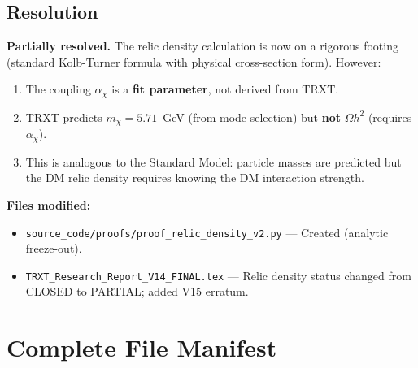 \documentclass[11pt,a4paper]{article}
\begin{document}
\subsection{Resolution}
\begin{mdframed}[backgroundcolor=yellow!10]
\textbf{Partially resolved.}  The relic density calculation is now on a rigorous footing (standard Kolb-Turner formula with physical cross-section form).  However:
\begin{enumerate}
    \item The coupling $\alpha_\chi$ is a \textbf{fit parameter}, not derived from TRXT.
    \item TRXT predicts $m_\chi = 5.71$~GeV (from mode selection) but \textbf{not} $\Omega h^2$ (requires $\alpha_\chi$).
    \item This is analogous to the Standard Model: particle masses are predicted but the DM relic density requires knowing the DM interaction strength.
\end{enumerate}
\end{mdframed}

\textbf{Files modified:}
\begin{itemize}
    \item \texttt{source\_code/proofs/proof\_relic\_density\_v2.py} --- Created (analytic freeze-out).
    \item \texttt{TRXT\_Research\_Report\_V14\_FINAL.tex} --- Relic density status changed from CLOSED to PARTIAL; added V15 erratum.
\end{itemize}

\section{Complete File Manifest}
\label{sec:manifest}
\end{document}
